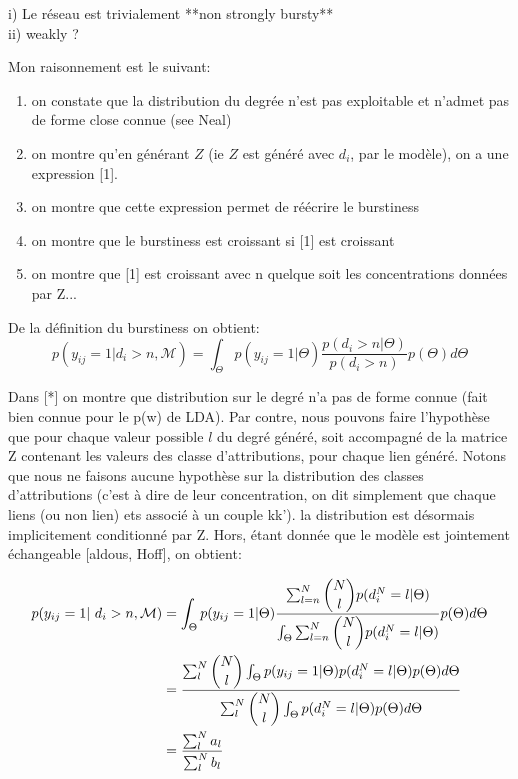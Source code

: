 \documentclass[a4paper, 12pt]{article}
\begin{document}
i) Le réseau est trivialement **non strongly bursty**\\
ii) weakly ? 

Mon raisonnement est le suivant:
\begin{enumerate}

\item on constate que la distribution du degrée n'est pas exploitable et n'admet pas de forme close connue (see Neal)
\item on montre qu'en générant $Z$  (ie $Z$ est généré avec $d_i$, par le modèle), on a une expression [1].
\item on montre que cette expression permet de réécrire le burstiness
\item on montre que le burstiness est croissant si [1] est croissant
\item on montre que [1] est croissant avec n quelque soit les concentrations données par Z...
\end{enumerate}

De la définition du burstiness on obtient:
\begin{equation} 
p(y_{ij} = 1 | d_i>n, \mathcal{M}) = \int_{\Theta} p(y_{ij}=1|\Theta) \frac{p(d_i>n | \Theta)}{p(d_i>n)} p(\Theta) d\Theta
\end{equation}

Dans [*] on montre que distribution sur le degré n'a pas de forme connue (fait bien connue pour le p(w) de LDA).
Par contre, nous pouvons faire l'hypothèse que pour chaque valeur possible $l$  du degré généré, soit accompagné de la matrice Z contenant les valeurs des classe d'attributions, pour chaque lien généré. Notons que nous ne faisons aucune hypothèse sur la distribution des classes d'attributions (c'est à dire de leur concentration, on dit simplement que chaque liens (ou non lien) ets associé à un couple kk'). la distribution est désormais implicitement conditionné par Z. Hors, étant donnée que le modèle est jointement échangeable [aldous, Hoff], on obtient:

\begin{align} \label{eq:sum}
p(y_{ij} = 1 | d_i>n, \mathcal{M}) &= \int_{\Theta} p(y_{ij}=1|\Theta) \frac{\sum_{l=n}^N\dbinom{N}{l} p(d_i^N=l | \Theta)}{\int_{\Theta}\sum_{l=n}^N \dbinom{N}{l}p(d_i^N=l | \Theta)} p(\Theta) d\Theta \\
&= \frac{\sum_l^N\dbinom{N}{l} \int_{\Theta} p(y_{ij}=1|\Theta) p(d_i^N=l | \Theta) p(\Theta) d\Theta }{\sum_l^N \dbinom{N}{l}\int_{\Theta} p(d_i^N=l | \Theta) p(\Theta) d\Theta } \\
&=  \frac{\sum_l^N a_l}{\sum_l^N b_l} 
\end{align}
\end{document}
